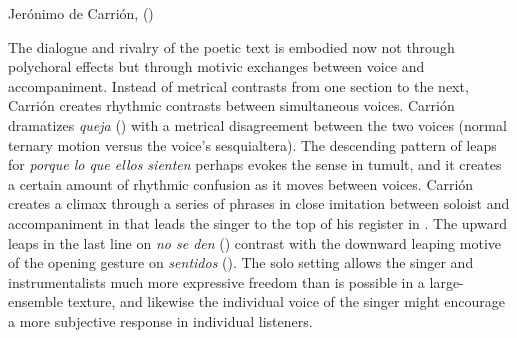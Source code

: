 \begin{musicexample}
    \caption{Jerónimo de Carrión,  ()} %

    \label{music:Carrion-Si_los_sentidos}

\end{musicexample}

The dialogue and rivalry of the poetic text is embodied now not through
polychoral effects but through motivic exchanges between voice and
accompaniment.
Instead of metrical contrasts from one section to the next, Carrión creates
rhythmic contrasts between simultaneous voices.
Carrión dramatizes \emph{queja} () with a metrical disagreement
between the two voices (normal ternary motion versus the voice's sesquialtera).
The descending pattern of leaps for \emph{porque lo que ellos sienten} perhaps
evokes the sense in tumult, and it creates a certain amount of rhythmic
confusion as it moves between voices.
Carrión creates a climax through a series of phrases in close imitation between
soloist and accompaniment in  that leads the singer to the top
of his register in .
The upward leaps in the last line on \emph{no se den} ()
contrast with the downward leaping motive of the opening gesture on
\emph{sentidos} ().
The solo setting allows the singer and instrumentalists much more expressive
freedom than is possible in a large-ensemble texture, and likewise the
individual voice of the singer might encourage a more subjective response in
individual listeners.

\endinput

\subsection{Ranking the Senses in Early Modern Philosophy}

The treatment of the senses in this villancico family reflects a common physiological model of sensation and perception, as educated Spaniards would have learned from the kind of scientific and theological treatises available to them in seminary and convent libraries in Spain and Mexico.[^seminary-libraries]
A typical example is the 1557 natural-philosophy textbook \emph{Phisica, Speculatio} by an Augustinian friar in New Spain, Alphonsus à Veracruce.
    \Autocite{Veracruce:Phisica}
Veracruce summarizes the traditional Catholic teaching, which drew on Aristotle as interpreted by Thomas Aquinas.
[@LuisdeGranada:Simbolo; @LuisdeGranada-Balcells:SimboloPtI]

